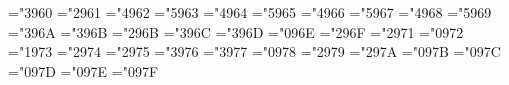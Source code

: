 \mathchardef\bfvdash="3960
\mathchardef\bfdashv="2961
\mathchardef\bflfloor="4962
\mathchardef\bfrfloor="5963
\mathchardef\bflceil="4964
\mathchardef\bfrceil="5965
\mathchardef\bflbrace="4966
\mathchardef\bfrbrace="5967
\mathchardef\bflangle="4968
\mathchardef\bfrangle="5969
\mathchardef\bfmid="396A
\mathchardef\bfparallel="396B
\mathchardef\bfVert="296B
\mathchardef\bfupdownarrow="396C
\mathchardef\bfUpdownarrow="396D
\mathchardef\bfbackslash="096E
\mathchardef\bfwr="296F
\def\bfsurd{{\mathchar"1970}}
\mathchardef\bfamalg="2971
\mathchardef\bfnabla="0972
\mathchardef\bfsmallint="1973
\mathchardef\bfsqcup="2974
\mathchardef\bfsqcap="2975
\mathchardef\bfsqsubseteq="3976
\mathchardef\bfsqsupseteq="3977
\mathchardef\bfS="0978
\mathchardef\bfdagger="2979
\mathchardef\bfddagger="297A
\mathchardef\bfP="097B
\mathchardef\bfclubsuit="097C
\mathchardef\bfdiamondsuit="097D
\mathchardef\bfheartsuit="097E
\mathchardef\bfspadesuit="097F
~                                                                         
